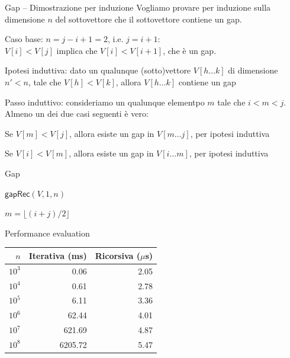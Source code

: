 \begin{frame}{Gap -- Dimostrazione per induzione}
Vogliamo provare per induzione sulla dimensione $n$ del sottovettore che 
il sottovettore contiene un gap.
\BIL
\item \alert{Caso base}: $n=j-i+1=2$, i.e. $j = i+1$: \\
$V[i]<V[j]$ implica che $V[i] < V[i+1]$, che è un gap.
\item \alert{Ipotesi induttiva}: dato un qualunque (sotto)vettore $V[h \ldots k]$ di 
dimensione $n'<n$, tale che $V[h] < V[k]$, allora $V[h \ldots k]$ contiene un gap
\item \alert{Passo induttivo}: consideriamo un qualunque elementpo
$m$ tale che $i<m<j$. Almeno un dei due casi seguenti è vero:
\BI
\item Se $V[m] < V[j]$, allora esiste un gap in $V[m \ldots j]$, per ipotesi
induttiva
\item Se $V[i] < V[m]$, allora esiste un gap in $V[i \ldots m]$, per ipotesi
induttiva
\EI
\EIL

\end{frame}

\begin{frame}{Gap}

\begin{Procedure}
\caption[A]{\textsf{gap}($\INTEGER[\,]\ V$, \INTEGER $n$)}
  \Return $\textsf{gapRec}(V, 1, n)$\;
\end{Procedure}

\begin{Procedure}
\caption[A]{\textsf{gapRec}($\INTEGER[\,]\ V$, \INTEGER $i$, \INTEGER $j$)}
$m = \lfloor (i+j)/2 \rfloor$\;

\end{Procedure}


\end{frame}

\begin{frame}{Performance evaluation}

\begin{center}
\begin{tabular}{|r|r|r|}
\hline
$n$ & \textbf{Iterativa (ms)} & \textbf{Ricorsiva (${\mu}$s)}\\\hline
$10^3$ & 0.06 & 2.05\\\hline
$10^4$ & 0.61 & 2.78\\\hline
$10^5$ & 6.11 & 3.36\\\hline
$10^6$ & 62.44 & 4.01\\\hline
$10^7$ & 621.69 & 4.87\\\hline
$10^8$ & 6205.72 & 5.47\\\hline
\end{tabular}
\end{center}

\end{frame}








\begin{frame}{}

\end{frame}
